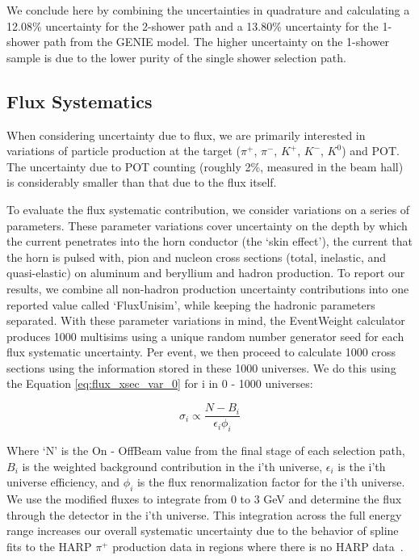 We conclude here by combining the uncertainties in quadrature and calculating a 12.08\% uncertainty for the 2-shower path and a 13.80\% uncertainty for the 1-shower path from the GENIE model.  The higher uncertainty on the 1-shower sample is due to the lower purity of the single shower selection path.

\clearpage
\subsection{Flux Systematics}
When considering uncertainty due to flux, we are primarily interested in variations of particle production at the target ($\pi^+$, $\pi^-$, $K^+$, $K^-$, $K^0$) and POT.  The uncertainty due to POT counting (roughly 2\%, measured in the beam hall) is considerably smaller than that due to the flux itself. 
\par To evaluate the flux systematic contribution, we consider variations on a series of parameters.  These parameter variations cover uncertainty on the depth by which the current penetrates into the horn conductor (the ‘skin effect’), the current that the horn is pulsed with, pion and nucleon cross sections
(total, inelastic, and quasi-elastic) on aluminum and beryllium and hadron production. To report our results, we combine all non-hadron production uncertainty contributions into one reported value called `FluxUnisim', while keeping the hadronic parameters separated. With these parameter variations in mind, the EventWeight calculator produces 1000 multisims using a unique random number generator seed for each flux systematic uncertainty. Per event, we then proceed to calculate 1000 cross sections using the information stored in these 1000 universes.  We do this using the Equation \ref{eq:flux_xsec_var_0} for i in 0 - 1000 universes:

\begin{equation} \label{eq:flux_xsec_var_0}
  \sigma_i \propto \frac{N - B_i}{\epsilon_i \phi_i} 
\end{equation}

Where `N' is the On - OffBeam value from the final stage of each selection path, $B_i$ is the weighted background contribution in the i'th universe, $\epsilon_i$ is the i'th universe efficiency, and $\phi_i$ is the flux renormalization factor for the i'th universe.  We use the modified fluxes to integrate from 0 to 3 GeV and determine the flux through the detector in the i'th universe. This integration across the full energy range increases our overall systematic uncertainty due to the behavior of spline fits to the HARP $\pi^{+}$ production data in regions where there is no HARP data~\cite{bib:flux_uncertainty_tn}. 

